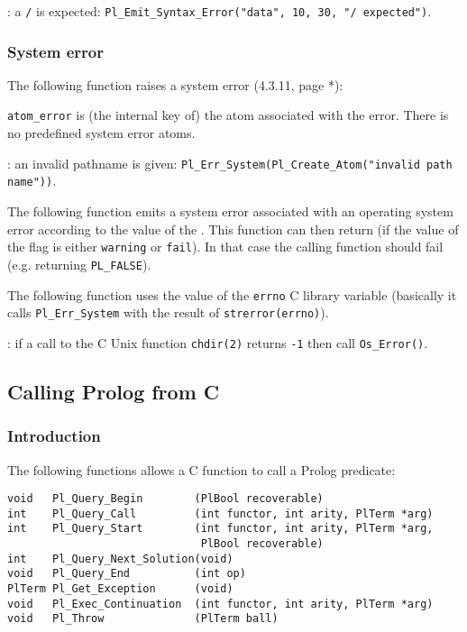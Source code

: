 
: a \texttt{/} is expected:
\texttt{Pl\_Emit\_Syntax\_Error("data", 10, 30, "/ expected")}.

\subsubsection{System error}
The following function raises a system error (4.3.11, page *):


\texttt{atom\_error} is (the internal key of) the atom associated with the
error. There is no predefined system error atoms.

: an invalid pathname is given:
\texttt{Pl\_Err\_System(Pl\_Create\_Atom("invalid path name"))}.

The following function emits a system error associated with an operating
system error according to the value of the   . This function can then return (if the
value of the flag is either \texttt{warning} or \texttt{fail}). In that case
the calling function should fail (e.g. returning \texttt{PL\_FALSE}).

The following function uses the value of the \texttt{errno} C library
variable (basically it calls \texttt{Pl\_Err\_System} with the result
of \texttt{strerror(errno)}).


: if a call to the C Unix function \texttt{chdir(2)} returns
\texttt{-1} then call \texttt{Os\_Error()}.


\subsection{Calling Prolog from C}

\subsubsection{Introduction}
The following functions allows a C function to call a Prolog predicate:

\begin{Indentation}
\begin{verbatim}
void   Pl_Query_Begin        (PlBool recoverable)
int    Pl_Query_Call         (int functor, int arity, PlTerm *arg)
int    Pl_Query_Start        (int functor, int arity, PlTerm *arg,
                              PlBool recoverable)
int    Pl_Query_Next_Solution(void)
void   Pl_Query_End          (int op)
PlTerm Pl_Get_Exception      (void)
void   Pl_Exec_Continuation  (int functor, int arity, PlTerm *arg)
void   Pl_Throw              (PlTerm ball)
\end{verbatim}
\end{Indentation}

